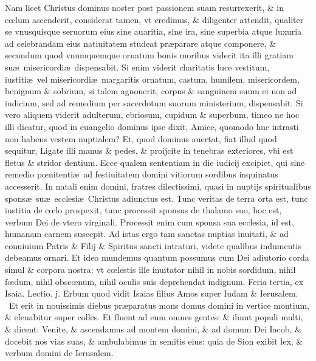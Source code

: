 \documentclass[a5paper,10pt]{book}
\def\leftmarginnote{%
	\lrmarginnote{\hskip -\marginparsep \hskip -6.5em}}
\def\ae{æ}
\def\oe{œ}
\begin{document}
\begin{multicols*}{2}
Nam licet Christus dominus noster post passionem suam resurrexerit, \& in c\oe lum ascenderit, considerat tamen, vt credimus, \& diligenter attendit, qualiter se vnusquisque seruorum eius sine auaritia, sine ira, sine superbia atque luxuria ad celebrandam eius natiuitatem studeat pr\ae parare atque componere, \& secundum quod vnumquemque ornatum bonis moribus viderit ita illi gratiam su\ae \ misericordi\ae \ dispensabit.
Si enim viderit charitatis luce vestitum, iustiti\ae \ vel misericordi\ae \ margaritis ornatum, castum, humilem, misericordem, benignum \& sobrium, si talem agnouerit, corpus \& sanguinem suum ei non ad iudicium, sed ad remedium per sacerdotum suorum ministerium, dispensabit.
Si vero aliquem viderit adulterum, ebriosum, cupidum \& superbum, timeo ne hoc illi dicatur, quod in euangelio dominus ipse dixit, Amice, quomodo huc intrasti non habens vestem nuptialem?
Et, quod dominus auertat, fiat illud quod sequitur, Ligate illi manus \& pedes, \& proijcite in tenebras exteriores, vbi est fletus \& stridor dentium.
Ecce qualem sententiam in die iudicij excipiet, qui sine remedio p\oe nitenti\ae \ ad festiuitatem domini vitiorum sordibus inquinatus accesserit.
In natali enim domini, fratres dilectissimi, quasi in nuptijs spiritualibus spons\ae \ su\ae \ ecclesi\ae \ Christus adiunctus est.
Tunc veritas de terra orta est, tunc iustitia de c\oe lo prospexit, tunc processit sponsus de thalamo suo, hoc est, verbum Dei de vtero virginali.
Processit enim cum sponsa sua ecclesia, id est, humanam carnem suscepit.
Ad istas ergo tam sanctas nuptias inuitati, \& ad conuiuium Patris \& Filij \& Spiritus sancti intraturi, videte qualibus indumentis debeamus ornari.
Et ideo mundemus quantum possumus cum Dei adiutorio corda simul \& corpora nostra: vt c\oe lestis ille inuitator nihil in nobis sordidum, nihil f\oe dum, nihil obsc\oe num, nihil oculis suis deprehendat indignum.
\newline {} \color{red} \hypertarget{TUE-PRIMA-ADV}{Feria tertia,} ex Isaia. \hfill Lectio. j. \color{black}
\vspace{-.5em}
Erbum\leftmarginnote{\begin{flushright}c.2.a\end{flushright}} quod vidit Isaias filius Amos super Iudam \& Ierusalem. \textdagger \ 
Et erit in nouissimis diebus pr\ae paratus mons domus domini in vertice montium, \& eleuabitur super colles.
Et fluent ad eum omnes gentes: \& ibunt populi multi, \& dicent: Venite, \& ascendamus ad montem domini, \& ad domum Dei Iacob, \& docebit nos vias suas, \& ambulabimus in semitis eius: quia de Sion exibit lex, \& verbum domini de Ierusalem.

\end{multicols*}
\end{document}
